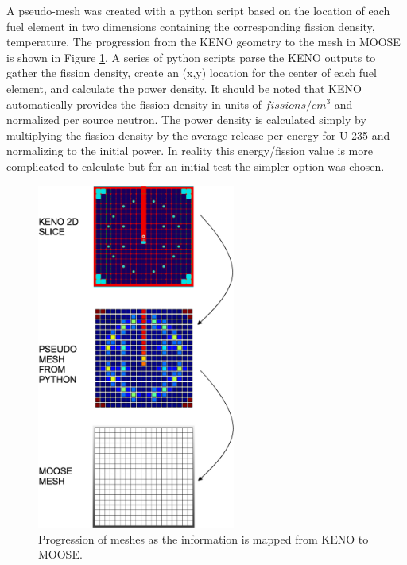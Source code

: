 \documentclass[11pt]{article}
\begin{document}
A pseudo-mesh was created with a python script based on the location of each fuel element in two dimensions containing the corresponding fission density, temperature.  The progression from the KENO geometry to the mesh in MOOSE is shown in Figure \ref{fig:treat2d}.  A series of python scripts parse the KENO outputs to gather the fission density, create an (x,y) location for the center of each fuel element, and calculate the power density. It should be noted that KENO automatically provides the fission density in units of $fissions/cm^3$ and normalized per source neutron. The power density is calculated simply by multiplying the fission density by the average release per energy for U-235 and normalizing to the initial power.  In reality this energy/fission value is more complicated to calculate but for an initial test the simpler option was chosen. 


\begin{figure}
    \centering
    \includegraphics[width=6.5cm]{figures/progression-mesh.png}
    \caption{Progression of meshes as the information is mapped from KENO to MOOSE.}
    \label{fig:treat2d}
\end{figure}
\end{document}
